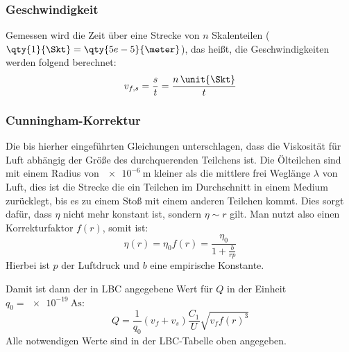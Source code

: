 \subsubsection{Geschwindigkeit}
Gemessen wird die Zeit über eine Strecke von \(n\) Skalenteilen (\(\qty{1}{\Skt}=\qty{5e-5}{\meter}\)), das heißt, die Geschwindigkeiten werden folgend berechnet:
\begin{equation}
    v_{f,s}=\frac{s}{t}=\frac{n\,\unit{\Skt}}{t}
    \label{eq:v}
\end{equation}

\subsubsection{Cunningham-Korrektur}
Die bis hierher eingeführten Gleichungen unterschlagen, dass die Viskosität für Luft abhängig der Größe des durchquerenden Teilchens ist. Die Ölteilchen sind mit einem Radius von \(\qty{e-6}{\meter}\) kleiner als die mittlere frei Weglänge \(\lambda\) von Luft, dies ist die Strecke die ein Teilchen im Durchschnitt in einem Medium zurücklegt, bis es zu einem Stoß mit einem anderen Teilchen kommt. Dies sorgt dafür, dass \(\eta\) nicht mehr konstant ist, sondern \(\eta\sim r\) gilt. Man nutzt also einen Korrekturfaktor \(f(r)\), somit ist:
\begin{equation}
    \eta(r) = \eta_0 f(r) = \frac{\eta_0}{1 + \frac{b}{r p}}
    \label{eq:f(r)}
\end{equation} 
Hierbei ist \(p\) der Luftdruck und \(b\) eine empirische Konstante. 

Damit ist dann der in LBC angegebene Wert für \(Q\) in der Einheit \(q_0=\qty{e-19}{\ampere\s}\):
\begin{equation}
    Q=\frac{1}{q_0}(v_f+v_s)\frac{C_1}{U}\sqrt{v_ff(r)^3}
    \label{eq:qkorr}
\end{equation}
Alle notwendigen Werte sind in der LBC-Tabelle oben angegeben.
